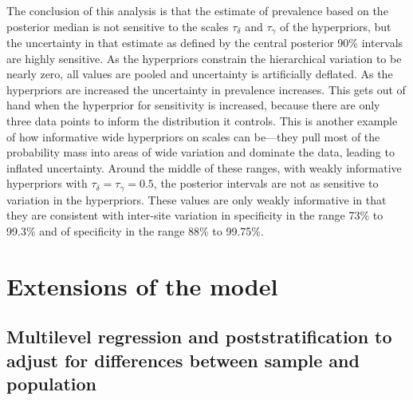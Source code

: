 \documentclass[11pt]{article}
\begin{document}
The conclusion of this analysis is that the estimate of prevalence
based on the posterior median is not sensitive to the scales
$\tau_{\delta}$ and $\tau_{\gamma}$ of the hyperpriors, but the
uncertainty in that estimate as defined by the central posterior 90\%
intervals are highly sensitive. As the hyperpriors constrain the
hierarchical variation to be nearly zero, all values are pooled and
uncertainty is artificially deflated. As the hyperpriors are increased
the uncertainty in prevalence increases. This gets out of hand when
the hyperprior for sensitivity is increased, because there are only
three data points to inform the distribution it controls. This is
another example of how informative wide hyperpriors on scales can
be---they pull most of the probability mass into areas of wide
variation and dominate the data, leading to inflated uncertainty.
Around the middle of these ranges, with weakly informative hyperpriors
with $\tau_{\delta} = \tau_{\gamma} = 0.5$, the posterior intervals
are not as sensitive to variation in the hyperpriors. These values are
only weakly informative in that they are consistent with inter-site
variation in specificity in the range 73\% to 99.3\% and of specificity
in the range 88\% to 99.75\%.

\section{Extensions of the model}

\subsection{Multilevel regression and poststratification to adjust for differences between sample and population}\label{mrp}
\end{document}
